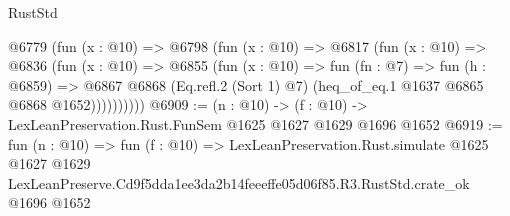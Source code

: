 \begin{lexlean}{RustStd}
\begin{coremodule}
          @6779
            (fun (x : @10) =>
            @6798
              (fun (x : @10) =>
              @6817
                (fun (x : @10) =>
                @6836
                  (fun (x : @10) =>
                  @6855
                    (fun (x : @10) =>
                    fun (fn : @7) =>
                    fun (h : @6859) =>
                    @6867
                      @6868
                      (Eq.refl.{2} (Sort 1) @7)
                      (heq_of_eq.{1} @1637 @6865 @6868 @1652))))))))))
@6909 := (n : @10) -> (f : @10) -> LexLeanPreservation.Rust.FunSem @1625 @1627 @1629 @1696 @1652
@6919 := fun (n : @10) =>
  fun (f : @10) =>
  LexLeanPreservation.Rust.simulate
    @1625
    @1627
    @1629
    LexLeanPreserve.Cd9f5dda1ee3da2b14feeeffe05d06f85.R3.RustStd.crate_ok
    @1696
    @1652
\end{coremodule}
\end{lexlean}
